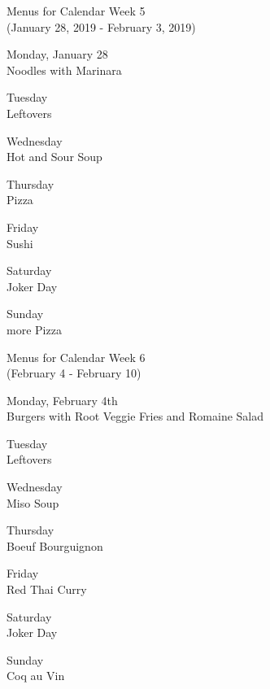 \documentclass[12pt, parskip=full*]{scrreprt}
\begin{document}
\begin{center}
{\Large Menus for Calendar Week 5} \\
{\small (January 28, 2019 - February 3, 2019)}

{\calligra \Large Monday, January 28} \\
Noodles with Marinara

{\calligra \Large Tuesday} \\
Leftovers

{\calligra \Large Wednesday} \\
Hot and Sour Soup

{\calligra \Large Thursday} \\
Pizza

{\calligra \Large Friday} \\
Sushi

{\calligra \Large Saturday} \\
Joker Day

{\calligra \Large Sunday} \\
more Pizza
\newpage

{\Large Menus for Calendar Week 6} \\ 
{\small (February 4 - February 10)}

{\calligra \Large Monday, February 4th} \\
Burgers with Root Veggie Fries and Romaine Salad

{\calligra \Large Tuesday} \\
Leftovers

{\calligra \Large Wednesday} \\
Miso Soup

{\calligra \Large Thursday} \\
Boeuf Bourguignon

{\calligra \Large Friday} \\
Red Thai Curry

{\calligra \Large Saturday} \\
Joker Day

{\calligra \Large Sunday} \\
Coq au Vin

\end{center}
\end{document}
